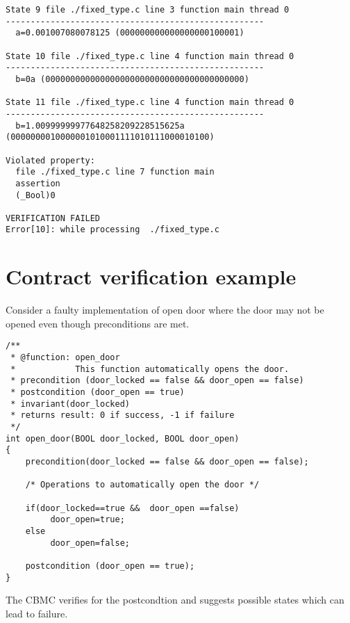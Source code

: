 \begin{lstlisting}
State 9 file ./fixed_type.c line 3 function main thread 0
----------------------------------------------------
  a=0.001007080078125 (000000000000000000100001)

State 10 file ./fixed_type.c line 4 function main thread 0
----------------------------------------------------
  b=0a (0000000000000000000000000000000000000000)

State 11 file ./fixed_type.c line 4 function main thread 0
----------------------------------------------------
  b=1.00999999977648258209228515625a 
(0000000010000001010001111010111000010100)

Violated property:
  file ./fixed_type.c line 7 function main
  assertion
  (_Bool)0

VERIFICATION FAILED
Error[10]: while processing  ./fixed_type.c
\end{lstlisting}


\chapter{Contract verification example} \label{appendix:b}

Consider a faulty implementation of open door where the door may not be opened even though preconditions are met.

\begin{lstlisting}
/**
 * @function: open_door
 *            This function automatically opens the door.
 * precondition (door_locked == false && door_open == false)
 * postcondition (door_open == true)
 * invariant(door_locked)
 * returns result: 0 if success, -1 if failure
 */
int open_door(BOOL door_locked, BOOL door_open)
{
    precondition(door_locked == false && door_open == false);

    /* Operations to automatically open the door */

    if(door_locked==true &&  door_open ==false)
         door_open=true;
    else
         door_open=false;

    postcondition (door_open == true);
}

\end{lstlisting}

The CBMC verifies for the postcondtion and suggests possible states which can lead to failure.

